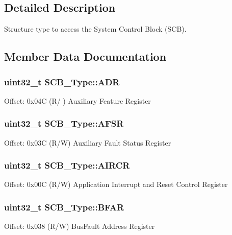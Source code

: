 \subsection{Detailed Description}
Structure type to access the System Control Block (S\+CB). 

\subsection{Member Data Documentation}
\subsubsection[{\texorpdfstring{A\+DR}{ADR}}]{ uint32\+\_\+t S\+C\+B\+\_\+\+Type\+::\+A\+DR}\hypertarget{struct_s_c_b___type_aaedf846e435ed05c68784b40d3db2bf2}{}\label{struct_s_c_b___type_aaedf846e435ed05c68784b40d3db2bf2}
Offset\+: 0x04C (R/ ) Auxiliary Feature Register 
\subsubsection[{\texorpdfstring{A\+F\+SR}{AFSR}}]{ uint32\+\_\+t S\+C\+B\+\_\+\+Type\+::\+A\+F\+SR}\hypertarget{struct_s_c_b___type_aeb77053c84f49c261ab5b8374e8958ef}{}\label{struct_s_c_b___type_aeb77053c84f49c261ab5b8374e8958ef}
Offset\+: 0x03C (R/W) Auxiliary Fault Status Register 
\subsubsection[{\texorpdfstring{A\+I\+R\+CR}{AIRCR}}]{ uint32\+\_\+t S\+C\+B\+\_\+\+Type\+::\+A\+I\+R\+CR}\hypertarget{struct_s_c_b___type_a6ed3c9064013343ea9fd0a73a734f29d}{}\label{struct_s_c_b___type_a6ed3c9064013343ea9fd0a73a734f29d}
Offset\+: 0x00C (R/W) Application Interrupt and Reset Control Register 
\subsubsection[{\texorpdfstring{B\+F\+AR}{BFAR}}]{ uint32\+\_\+t S\+C\+B\+\_\+\+Type\+::\+B\+F\+AR}\hypertarget{struct_s_c_b___type_a31f79afe86c949c9862e7d5fce077c3a}{}\label{struct_s_c_b___type_a31f79afe86c949c9862e7d5fce077c3a}
Offset\+: 0x038 (R/W) Bus\+Fault Address Register 
